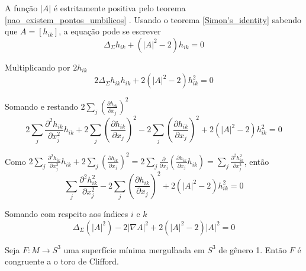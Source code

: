 \begin{demonstracao}
	A função $|A|$ é estritamente positiva pelo teorema \ref{nao_existem_pontos_umbilicos} . Usando o  teorema \ref{Simon's_identity} sabendo que $A = [h_{ik}]$, a equação pode se escrever
	\begin{equation*}
		\Delta_{\Sigma} h_{ik} + (|A|^2 - 2)h_{ik} = 0
	\end{equation*}
	
	Multiplicando por $2 h_{ik}$
	\begin{equation*}
		2 \Delta_{\Sigma} h_{ik} h_{ik} + 2 (|A|^2 - 2)h_{ik}^2 = 0
	\end{equation*}
	
	Somando e restando $ 2 \sum_j \left( \frac{\partial h_{ik}}{\partial x_j} \right)^2 $
	\begin{equation*}
		2 \sum_j \frac{\partial^2 h_{ik}}{\partial x_j^2} h_{ik} + 2 \sum_j \left( \frac{\partial h_{ik}}{\partial x_j} \right)^2 - 2 \sum_j \left( \frac{\partial h_{ik}}{\partial x_j} \right)^2 + 2 (|A|^2 - 2)h_{ik}^2 = 0
	\end{equation*}
	
	Como $ 2 \sum_j \frac{\partial^2 h_{ik}}{\partial x_j^2} h_{ik} + 2 \sum_j \left( \frac{\partial h_{ik}}{\partial x_j} \right)^2 = 2 \sum_j \frac{\partial }{\partial x_j} \left( \frac{\partial h_{ik}}{\partial x_j} h_{ik} \right) = \sum_j \frac{\partial^2 h_{ik}^2}{\partial x_j^2} $, então
	\begin{equation*}
		\sum_j \frac{\partial^2 h_{ik}^2}{\partial x_j^2} - 2 \sum_j \left( \frac{\partial h_{ik}}{\partial x_j} \right)^2 + 2 (|A|^2 - 2)h_{ik}^2 = 0
	\end{equation*}
	
	Somando com respeito aos índices $i$ e $k$
	\begin{equation*}
	\Delta_{\Sigma} (|A|^2) - 2 | \nabla A |^2 + 2 (|A|^2 - 2) |A|^2 = 0
	\end{equation*}
\end{demonstracao}

\begin{teorema}[Brendle]
	Seja $F: M \rightarrow S^3$ uma superfície mínima mergulhada em $S^3$ de gênero 1. Então $F$ é congruente a o toro de Clifford.
\end{teorema}